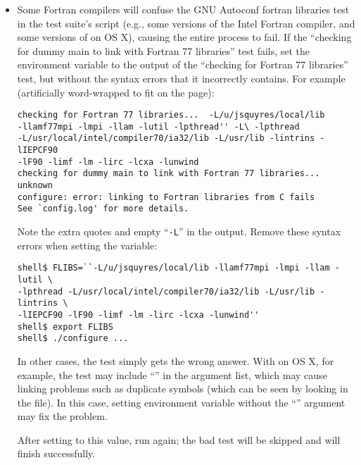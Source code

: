 \begin{itemize}
\item Some Fortran compilers will confuse the GNU Autoconf fortran
  libraries test in the test suite's  script (e.g.,
  some versions of the Intel Fortran compiler, and some versions of
   on OS X), causing the entire process to fail.  If the
  ``checking for dummy main to link with Fortran 77 libraries'' test
  fails, set the  environment variable to the output of
  the ``checking for Fortran 77 libraries'' test, but without the
  syntax errors that it incorrectly contains.  For example
  (artificially word-wrapped to fit on the page):

\lstset{style=lam-shell}
\begin{lstlisting}
checking for Fortran 77 libraries...  -L/u/jsquyres/local/lib
-llamf77mpi -lmpi -llam -lutil -lpthread'' -L\ -lpthread
-L/usr/local/intel/compiler70/ia32/lib -L/usr/lib -lintrins -lIEPCF90
-lF90 -limf -lm -lirc -lcxa -lunwind
checking for dummy main to link with Fortran 77 libraries... unknown
configure: error: linking to Fortran libraries from C fails
See `config.log' for more details.
\end{lstlisting}

  Note the extra quotes and empty ``{\tt -L}'' in the output.  Remove
  these syntax errors when setting the  variable:

\lstset{style=lam-cmdline}
\begin{lstlisting}
shell$ FLIBS=``-L/u/jsquyres/local/lib -llamf77mpi -lmpi -llam -lutil \
-lpthread -L/usr/local/intel/compiler70/ia32/lib -L/usr/lib -lintrins \
-lIEPCF90 -lF90 -limf -lm -lirc -lcxa -lunwind''
shell$ export FLIBS
shell$ ./configure ...
\end{lstlisting}

  
  In other cases, the test simply gets the wrong answer.  With
   on OS X, for example, the test may include
  ``\cmd{-lcrt2.o}'' in the argument list, which may cause linking
  problems such as duplicate symbols (which can be seen by looking in
  the \file{config.log} file).  In this case, setting 
  environment variable without the ``\cmd{-lcrt2.o}'' argument may fix
  the problem.


  After setting  to this value, run 
  again; the bad test will be skipped and  will finish
  successfully.


\end{itemize}
